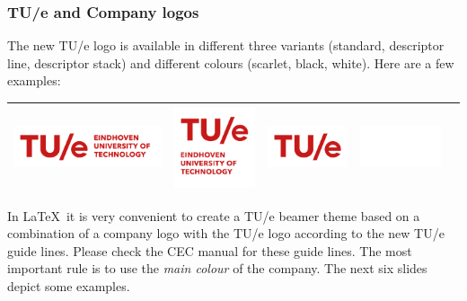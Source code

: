 \documentclass[t,aspectratio=169]{beamer}
\begin{document}
\begin{frame}
  \frametitle{TU/e and Company logos}
  
  The new TU/e logo is available in different three variants (standard, descriptor line, descriptor stack) and different colours (scarlet, black, white). Here are a few examples:
  
  \newlength{\lh}
  \setlength{\lh}{0.85cm}
  \begin{center}
    \begin{tabular}{|c|c|c|c|c|}
      \hline
      \includegraphics[height=\lh]{TUe-logo-descriptor-line-scarlet-rgb}  & 
      \includegraphics[height=\lh]{TUe-logo-descriptor-stack-scarlet-rgb} & 
      \includegraphics[height=\lh]{TUe-logo-scarlet-rgb}                  & 
      \cellcolor{tuedarkblue}\includegraphics[height=\lh]{TUe-logo-white}    \\
      \hline
    \end{tabular}
  \end{center}
  
  In \LaTeX\ it is very convenient to create a TU/e beamer theme based on a combination of a company logo with the TU/e logo according to the new TU/e guide lines. Please check the CEC manual for these guide lines. The most important rule is to use the \emph{main colour} of the company. The next six slides depict some examples.
\end{frame}
\end{document}
